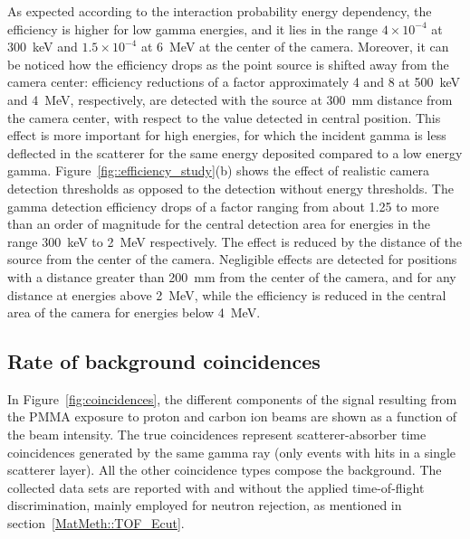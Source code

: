 As expected according to the interaction probability energy dependency, the efficiency is higher for low gamma energies, and it lies in the range $4\times10^{-4}$ at 300~keV and $1.5\times10^{-4}$ at 6~MeV at the center of the camera. Moreover, it can be noticed how the efficiency drops as the point source is shifted away from the camera center: efficiency reductions of a factor approximately 4 and 8 at 500~keV and 4~MeV, respectively, are detected with the source at 300~mm distance from the camera center, with respect to the value detected in central position. This effect is more important for high energies, for which the incident gamma is less deflected in the scatterer for the same energy deposited compared to a low energy gamma.   
Figure~\ref{fig::efficiency_study}(b) shows the effect of realistic camera detection thresholds as opposed to the detection without energy thresholds. The gamma detection efficiency drops of a factor ranging from about 1.25 to more than an order of magnitude for the central detection area for energies in the range 300~keV to 2~MeV respectively. The effect is reduced by the distance of the source from the center of the camera. Negligible effects are detected for positions with a distance greater than 200~mm from the center of the camera, and for any distance at energies above 2~MeV, while the efficiency is reduced in the central area of the camera for energies below 4~MeV.\\
 
\subsection{Rate of background coincidences}
\label{Results::beamInt}
 
In Figure~\ref{fig:coincidences}, the different components of the signal resulting from the PMMA exposure to proton and carbon ion beams are shown as a function of the beam intensity. The true coincidences represent scatterer-absorber time coincidences generated by the same gamma ray (only events with hits in a single scatterer layer). All the other coincidence types compose the background. The collected data sets are reported with and without the applied time-of-flight discrimination, mainly employed for neutron rejection, as mentioned in section~\ref{MatMeth::TOF_Ecut}.

